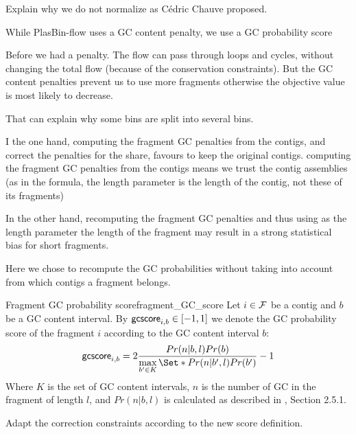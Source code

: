 \begin{todobox}
    Explain why we do not normalize as Cédric Chauve proposed.
\end{todobox}

\begin{newfeatbox}
    While PlasBin-flow uses a GC content penalty, we use a GC probability score

    \begin{questionbox}
        Before we had a penalty.
        The flow can pass through loops and cycles, without changing the total flow (because of the conservation constraints). But the GC content penalties prevent us to use more fragments otherwise the objective value is most likely to decrease.
    
        That can explain why some bins are split into several bins.
    \end{questionbox}

    \begin{questionbox}
        I the one hand, computing the fragment GC penalties from the contigs, and correct the penalties for the share, favours to keep the original contigs. computing the fragment GC penalties from the contigs means we trust the contig assemblies (as in the formula, the length parameter is the length of the contig, not these of its fragments)
        
        In the other hand, recomputing the fragment GC penalties and thus using as the length parameter the length of the fragment may result in a strong statistical bias for short fragments.
    
        \begin{notebox}
            Here we chose to recompute the GC probabilities without taking into account from which contigs a fragment belongs. 
        \end{notebox}
    \end{questionbox}
\end{newfeatbox}

\begin{definition}{Fragment GC probability score}{fragment_GC_score}
    Let \(i \in \mathcal{F}{}\) be a contig and \(b\) be a GC content interval.
    By \(\mathsf{gcscore}_{i, b} \in [-1, 1]\) we denote the GC probability score of the fragment \(i\) according to the GC content interval \(b\):
    \[
    \gcscore{i}{b} = 2 \frac{Pr(n|b,l)Pr(b)}{\max\limits_{b' \in K}\Set*{Pr(n|b',l)Pr(b')}} - 1
    \]
    Where \(K\) is the set of GC content intervals, \(n\) is the number of GC in the fragment of length \(l\), and \(Pr(n|b,l)\) is calculated as described in \cite{manePlasBinflowFlowbasedMILP2023}, Section 2.5.1.
    
    \begin{fixmebox}
        Adapt the correction constraints according to the new score definition.
    \end{fixmebox}
\end{definition}

